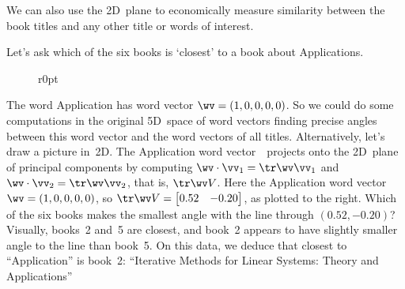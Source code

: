 We can also use the 2D~plane to economically measure similarity between the book titles and any other title or words of interest.

\begin{example} \label{eg:bks6q}
Let's ask which of the six books is `closest' to a book about Applications.

\begin{solution} 
\begin{figure}r{0pt}
\end{figure}
The word Application has word vector \(\wv=(1,0,0,0,0)\).
So we could do some computations in the original 5D~space of word vectors finding precise angles between this word vector and the word vectors of all titles.
Alternatively, let's draw a picture in~2D.
The Application word vector~\wv\ projects onto the 2D~plane of principal components by computing \(\wv\cdot\vv_1=\tr\wv\vv_1\) and \(\wv\cdot\vv_2=\tr\wv\vv_2\), that is, \(\tr\wv V\).
Here the Application word vector \(\wv=(1,0,0,0,0)\), so \(\tr\wv V=\begin{bmatrix} 0.52 & -0.20 \end{bmatrix}\), as plotted to the right.
Which of the six books makes the smallest angle with the line through \((0.52,-0.20)\)?
Visually, books~2 and~5 are closest, and book~2 appears to have slightly smaller angle to the line than book~5.
On this data, we deduce that closest to ``Application'' is book~2: ``Iterative Methods for Linear Systems: Theory and Applications''
\aqed

\end{solution}
\end{example}






